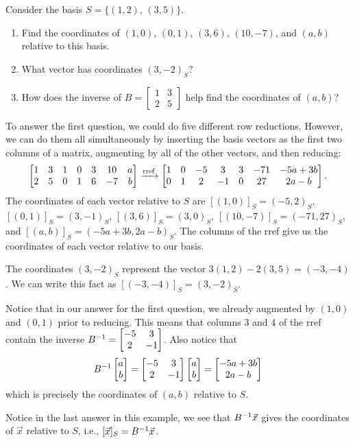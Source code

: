 \begin{example} Consider the basis $S=\{(1,2),\,(3,5)\}$. 
\begin{enumerate}
	\item Find the coordinates of $(1,0)$, $(0,1)$, $(3,6)$, $(10,-7)$, and $(a,b)$ relative to this basis.
	\item What vector has coordinates $(3,-2)_S$?
	\item How does the inverse of $B = \begin{bmatrix}1 & 3 \\ 2 & 5\end{bmatrix}$ help find the coordinates of $(a,b)$?
\end{enumerate}
 To answer the first question, we could do five different row reductions.  However, we can do them all simultaneously by inserting the basis vectors as the first two columns of a matrix, augmenting by all of the other vectors, and then reducing: 
$$\begin{bmatrix}
 1 & 3 & 1 & 0 & 3 & 10 & a \\
 2 & 5 & 0 & 1 & 6 & -7 & b
\end{bmatrix}
\xrightarrow{\operatorname{rref}}
\begin{bmatrix}
 1 & 0 & -5 & 3 & 3 & -71 & -5 a+3b \\
 0 & 1 & 2 & -1 & 0 & 27 & 2 a-b
\end{bmatrix}.$$
The coordinates of each vector relative to $S$ are $[(1,0)]_S = (-5,2)_S$, $[(0,1)]_S=(3,-1)_S$, $[(3,6)]_S=(3,0)_S$, $[(10,-7)]_S=(-71,27)_S$, and $[(a,b)]_S=(-5a+3b,2a-b)_S$. 
The columns of the rref give us the coordinates of each vector relative to our basis.

The coordinates $(3,-2)_S$ represent the vector $3(1,2)-2(3,5)=(-3,-4)$. We can write this fact as $[(-3,-4)]_S = (3,-2)_S$.

Notice that in our answer for the first question, we already augmented by $(1,0)$ and $(0,1)$ prior to reducing.  This means that columns 3 and 4 of the rref contain the inverse $B^{-1}  = \begin{bmatrix} -5 & 3\\ 2 & -1 \end{bmatrix}$.  Also notice that $$B^{-1} \begin{bmatrix} a\\b \end{bmatrix} = \begin{bmatrix} -5 & 3\\ 2 & -1 \end{bmatrix}\begin{bmatrix} a\\b \end{bmatrix} = \begin{bmatrix} -5a+3b\\2a-b \end{bmatrix}$$ which is precisely the coordinates of $(a,b)$ relative to $S$.  
\end{example}
Notice in the last answer in this example, we see that $B^{-1} \vec x$ gives the coordinates of $\vec x$ relative to $S$, i.e., $[\vec x]_S = B^{-1} \vec x$.


